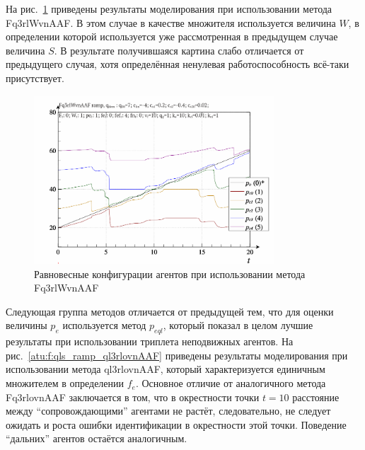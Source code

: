 На рис.~\ref{atu:f:qls_ramp_Fq3rlWvnAAF} приведены результаты моделирования
при использовании метода Fq3rlWvnAAF.
В этом случае в качестве множителя используется величина $W$,
в определении которой используется уже рассмотренная в предыдущем случае величина $S$.
В результате получившаяся картина слабо отличается от предыдущего случая,
хотя определённая ненулевая работоспособность всё-таки присутствует.

\begin{figure}[htb!]
  \begin{center}
    \includegraphics[width=0.8\textwidth]{p/ramp/qls-p_t_pi_Fq3rlWvnAAF_ramp.png}
  \end{center}
  \caption{Равновесные конфигурации агентов при использовании метода Fq3rlWvnAAF}
  \label{atu:f:qls_ramp_Fq3rlWvnAAF}
\end{figure}

Следующая группа методов отличается от предыдущей тем, что для оценки величины $p_e$
используется метод $p_{eql}$, который показал в целом лучшие результаты
при использовании триплета неподвижных агентов.
На рис.~\ref{atu:f:qls_ramp_ql3rlovnAAF} приведены результаты моделирования
при использовании метода ql3rlovnAAF, который характеризуется
единичным множителем в определении  $f_e$. Основное отличие от
аналогичного метода Fq3rlovnAAF заключается в том, что в окрестности
точки $t=10$ расстояние между ``сопровождающими'' агентами не растёт,
следовательно, не следует ожидать и роста ошибки идентификации в окрестности этой точки.
Поведение ``дальних'' агентов остаётся аналогичным.


